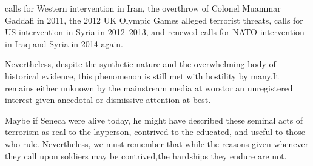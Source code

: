 \footnotecite[shipler2012]
\footnotecite[schwartz2013]
calls for Western intervention in Iran, %
\footnotecite[shakir2008] 
the overthrow of Colonel Muammar Gaddafi in 2011, %
the 2012 UK Olympic Games alleged terrorist threats, %
calls for US intervention in Syria in 2012--2013, %
\footnotecite[istreams2013]
and renewed calls for NATO intervention in Iraq and Syria in 2014 again.

Nevertheless, despite the synthetic nature and the overwhelming body of historical evidence, this phenomenon is still met with hostility by many. It remains either unknown by the mainstream media at worst or an unregistered interest given anecdotal or dismissive attention at best.

Maybe if Seneca were alive today, he might have described these seminal acts of terrorism as real to the layperson, contrived to the educated, and useful to those who rule. Nevertheless, we must remember that while the reasons given whenever they call upon soldiers may be contrived, the hardships they endure are not.

